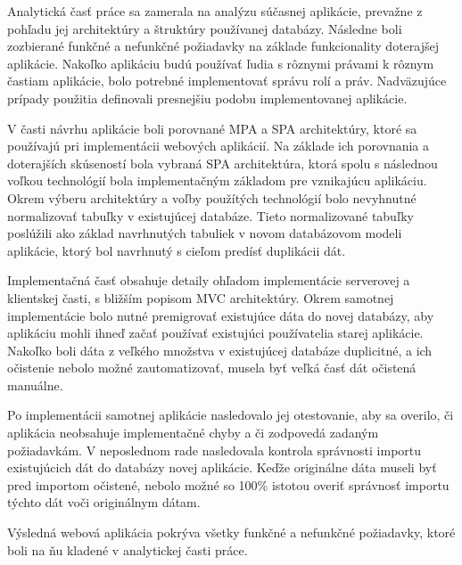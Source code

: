\begin{conclusion}
Analytická časť práce sa zamerala na analýzu súčasnej aplikácie, prevažne z pohľadu jej architektúry a štruktúry používanej databázy. Následne boli zozbierané funkčné a nefunkčné požiadavky na základe funkcionality doterajšej aplikácie. Nakoľko aplikáciu budú používať ľudia s rôznymi právami k rôznym častiam aplikácie, bolo potrebné implementovať správu rolí a práv. Nadväzujúce prípady použitia definovali presnejšiu podobu implementovanej aplikácie.

V časti návrhu aplikácie boli porovnané MPA a SPA architektúry, ktoré sa používajú pri implementácii webových aplikácií. Na základe ich porovnania a doterajších skúseností bola vybraná SPA architektúra, ktorá spolu s následnou voľkou technológií bola implementačným základom pre vznikajúcu aplikáciu. Okrem výberu architektúry a voľby použítých technológií bolo nevyhnutné normalizovať tabuľky v existujúcej databáze. Tieto normalizované tabuľky poslúžili ako základ navrhnutých tabuliek v novom databázovom modeli aplikácie, ktorý bol navrhnutý s cieľom predísť duplikácii dát.

Implementačná časť obsahuje detaily ohľadom implementácie serverovej a klientskej časti, s bližším popisom MVC architektúry.
Okrem samotnej implementácie bolo nutné premigrovať existujúce dáta do novej databázy, aby aplikáciu mohli ihneď začať používať existujúci používatelia starej aplikácie. Nakoľko boli dáta z veľkého množstva v existujúcej databáze duplicitné, a ich očistenie nebolo možné zautomatizovať, musela byť veľká časť dát očistená manuálne.

Po implementácii samotnej aplikácie nasledovalo jej otestovanie, aby sa overilo, či aplikácia neobsahuje implementačné chyby a či zodpovedá zadaným požiadavkám. V neposlednom rade nasledovala kontrola správnosti importu existujúcich dát do databázy novej aplikácie. Keďže originálne dáta museli byť pred importom očistené, nebolo možné so 100\% istotou overiť správnosť importu týchto dát voči originálnym dátam.

Výsledná webová aplikácia pokrýva všetky funkčné a nefunkčné požiadavky, ktoré boli na ňu kladené v analytickej časti práce.
\end{conclusion}